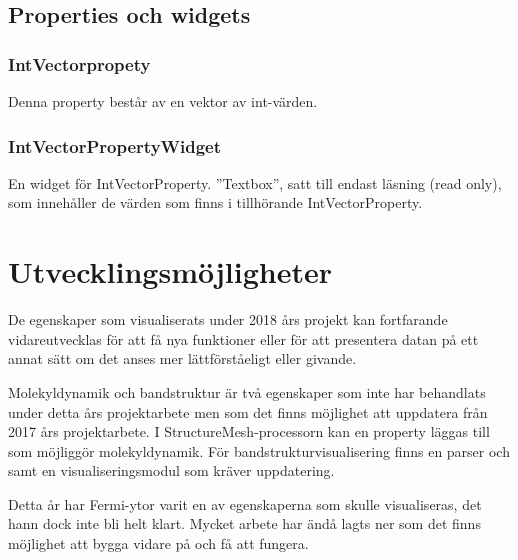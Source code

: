 \documentclass[a4paper,12pt]{article}
\begin{document}
\subsection{Properties och widgets}

\subsubsection{IntVectorpropety}
Denna property består av en vektor av int-värden.
\subsubsection{IntVectorPropertyWidget}
En widget för IntVectorProperty. ''Textbox'', satt till endast läsning (read only), som innehåller de värden som finns i tillhörande IntVectorProperty.

\section{Utvecklingsmöjligheter}
De egenskaper som visualiserats under 2018 års projekt kan fortfarande vidareutvecklas för att få nya funktioner eller för att presentera datan på ett annat sätt om det anses mer lättförståeligt eller givande.

Molekyldynamik och bandstruktur är två egenskaper som inte har behandlats under detta års projektarbete men som det finns möjlighet att uppdatera från 2017 års projektarbete. I StructureMesh-processorn kan en property läggas till som möjliggör molekyldynamik. För bandstrukturvisualisering finns en parser och samt en visualiseringsmodul som kräver uppdatering.

Detta år har Fermi-ytor varit en av egenskaperna som skulle visualiseras, det hann dock inte bli helt klart. Mycket arbete har ändå lagts ner som det finns möjlighet att bygga vidare på och få att fungera. 

\newpage
{}
\printbibliography{}
\end{document}
